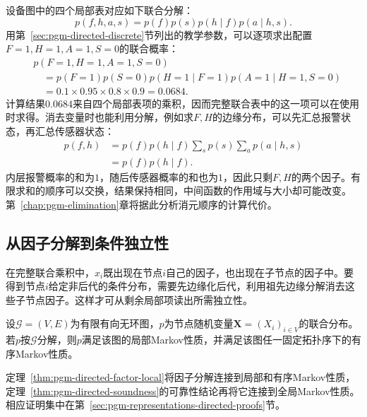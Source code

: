 设备图中的四个局部表对应如下联合分解：
\begin{equation}
  p(f,h,a,s)=p(f)p(s)p(h\mid f)p(a\mid h,s).
  \label{eq:pgm-directed-device-factor}
\end{equation}
用第~\ref{sec:pgm-directed-discrete}节列出的教学参数，可以逐项求出配置$F=1,H=1,A=1,S=0$的联合概率：
\begin{equation}
  \begin{aligned}
    &p(F=1,H=1,A=1,S=0)\\
    &\quad=p(F=1)p(S=0)p(H=1\mid F=1)
      p(A=1\mid H=1,S=0)\\
    &\quad=0.1\times0.95\times0.8\times0.9
      =0.0684.
  \end{aligned}
  \label{eq:pgm-directed-device-configuration}
\end{equation}
计算结果$0.0684$来自四个局部表项的乘积，因而完整联合表中的这一项可以在使用时求得。消去变量时也能利用分解，例如求$F,H$的边缘分布，可以先汇总报警状态，再汇总传感器状态：
\[
  \begin{aligned}
    p(f,h)
    &=p(f)p(h\mid f)
      \sum_s p(s)\sum_a p(a\mid h,s)\\
    &=p(f)p(h\mid f).
  \end{aligned}
\]
内层报警概率的和为$1$，随后传感器概率的和也为$1$，因此只剩$F,H$的两个因子。有限求和的顺序可以交换，结果保持相同，中间函数的作用域与大小却可能改变。第~\ref{chap:pgm-elimination}章将据此分析消元顺序的计算代价。

\subsection{从因子分解到条件独立性}
\label{sec:pgm-directed-factor-to-ci}

在完整联合乘积中，$x_i$既出现在节点$i$自己的因子，也出现在子节点的因子中。要得到节点$i$给定非后代的条件分布，需要先边缘化后代，利用祖先边缘分解消去这些子节点因子。这样才可从剩余局部项读出所需独立性。

\begin{theorem}[分解蕴含局部与有序Markov性质]
  \label{thm:pgm-directed-factor-local}
  设$\mathcal{G}=(V,E)$为有限有向无环图，$p$为节点随机变量$\bm{X}=(X_i)_{i\in V}$的联合分布。若$p$按$\mathcal{G}$分解，则$p$满足该图的局部Markov性质，并满足该图任一固定拓扑序下的有序Markov性质。
\end{theorem}

定理~\ref{thm:pgm-directed-factor-local}将因子分解连接到局部和有序Markov性质，定理~\ref{thm:pgm-directed-soundness}的可靠性结论再将它连接到全局Markov性质。相应证明集中在第~\ref{sec:pgm-representations-directed-proofs}节。

